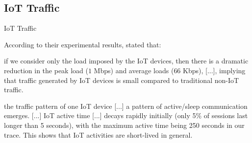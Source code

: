 \documentclass[10pt]{beamer}
\begin{document}
\subsection{IoT Traffic}
\begin{frame}{IoT Traffic}

According to their experimental results, \citet{ITPAReport} stated that:

\begin{quoting}[font=itshape, begintext={``}, endtext={''\cite[par.~IV.A]{ITPAReport}}]
\justifying
[...] if we consider only the load imposed by the IoT devices, then there is a dramatic reduction in the peak load ($1$ Mbps) and average loads ($66$ Kbps), [...], implying that traffic generated by IoT devices is small compared to traditional non-IoT traffic. 
\end{quoting}

\begin{quoting}[font=itshape, begintext={``}, endtext={''\cite[par.~IV.A]{ITPAReport}}]
\justifying
the traffic pattern of one IoT device [...] a pattern of active/sleep communication emerges. [...] IoT active time [...] decays rapidly initially (only 5\% of sessions last longer than 5 seconds), with the maximum active time being 250 seconds in our trace. This shows that IoT activities are short-lived in general. 
\end{quoting}


\end{frame} 
\end{document}
